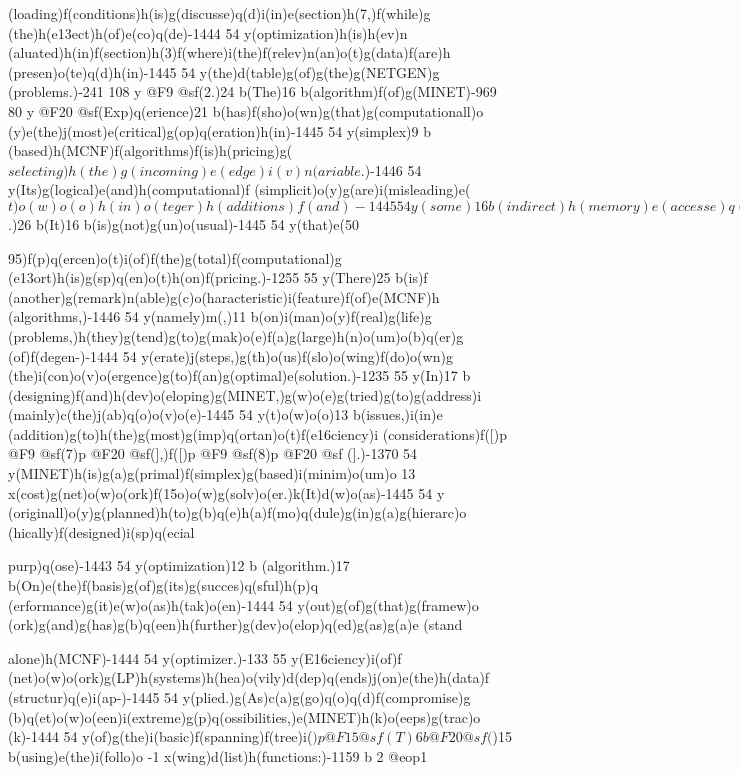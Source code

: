 {{{{(loading)f(conditions)h(is)g(discusse)q(d)i(in)e(section)h(7,)f(while)g
(the)h(e\013ect)h(of)e(co)q(de)-1444 54 y(optimization)h(is)h(ev)n
(aluated)h(in)f(section)h(3)f(where)i(the)f(relev)n(an)o(t)g(data)f(are)h
(presen)o(te)q(d)h(in)-1445 54 y(the)d(table)g(of)g(the)g(NETGEN)g
(problems.)-241 108 y @F9 @sf(2.)24 b(The)16 b(algorithm)f(of)g(MINET)-969 
80 y @F20 @sf(Exp)q(erience)21 b(has)f(sho)o(wn)g(that)g(computationall)o
(y)e(the)j(most)e(critical)g(op)q(eration)h(in)-1445 54 y(simplex)9 b
(based)h(MCNF)f(algorithms)f(is)h(pricing)g(\(selecting)h(the)g(incoming)e
(edge)i(v)n(ariable\).)-1446 54 y(Its)g(logical)e(and)h(computational)f
(simplicit)o(y)g(are)i(misleading)e(\(t)o(w)o(o)h(in)o(teger)h(additions)f
(and)-1445 54 y(some)16 b(indirect)h(memory)e(accesse)q(s)j(p)q(er)e
(scanned)i(non)o(basic)d(edges\).)26 b(It)16 b(is)g(not)g(un)o(usual)-1445 
54 y(that)e(50{95)f(p)q(ercen)o(t)i(of)f(the)g(total)f(computational)g
(e\013ort)h(is)g(sp)q(en)o(t)h(on)f(pricing.)-1255 55 y(There)25 b(is)f
(another)g(remark)n(able)g(c)o(haracteristic)i(feature)f(of)e(MCNF)h
(algorithms,)-1446 54 y(namely)m(,)11 b(on)i(man)o(y)f(real)g(life)g
(problems,)h(they)g(tend)g(to)g(mak)o(e)f(a)g(large)h(n)o(um)o(b)q(er)g
(of)f(degen-)-1444 54 y(erate)j(steps,)g(th)o(us)f(slo)o(wing)f(do)o(wn)g
(the)i(con)o(v)o(ergence)g(to)f(an)g(optimal)e(solution.)-1235 55 y(In)17 b
(designing)f(and)h(dev)o(eloping)g(MINET,)g(w)o(e)g(tried)g(to)g(address)i
(mainly)c(the)j(ab)q(o)o(v)o(e)-1445 54 y(t)o(w)o(o)13 b(issues,)i(in)e
(addition)g(to)h(the)g(most)g(imp)q(ortan)o(t)f(e\016ciency)i
(considerations)f([)p @F9 @sf(7)p @F20 @sf(],)f([)p @F9 @sf(8)p @F20 @sf
(].)-1370 54 y(MINET)h(is)g(a)g(primal)f(simplex)g(based)i(minim)o(um)o 
13 x(cost)g(net)o(w)o(ork)f(\015o)o(w)g(solv)o(er.)k(It)d(w)o(as)-1445 54 y
(originall)o(y)g(planned)h(to)g(b)q(e)h(a)f(mo)q(dule)g(in)g(a)g(hierarc)o
(hically)f(designed)i(sp)q(ecial{purp)q(ose)-1443 54 y(optimization)12 b
(algorithm.)17 b(On)e(the)f(basis)g(of)g(its)g(succes)q(sful)h(p)q
(erformance)g(it)e(w)o(as)h(tak)o(en)-1444 54 y(out)g(of)g(that)g(framew)o
(ork)g(and)g(has)g(b)q(een)h(further)g(dev)o(elop)q(ed)g(as)g(a)e
(stand{alone)h(MCNF)-1444 54 y(optimizer.)-133 55 y(E\016ciency)i(of)f
(net)o(w)o(ork)g(LP)h(systems)h(hea)o(vily)d(dep)q(ends)j(on)e(the)h(data)f
(structur)q(e)i(ap-)-1445 54 y(plied.)g(As)c(a)g(go)q(o)q(d)f(compromise)g
(b)q(et)o(w)o(een)i(extreme)g(p)q(ossibilities,)e(MINET)h(k)o(eeps)g(trac)o
(k)-1444 54 y(of)g(the)i(basic)f(spanning)f(tree)i(\()p @F15 @sf(T)6 b 
@F20 @sf(\))15 b(using)e(the)i(follo)o -1 x(wing)d(list)h(functions:)-1159 b
2 @eop1

}}}}}}}
